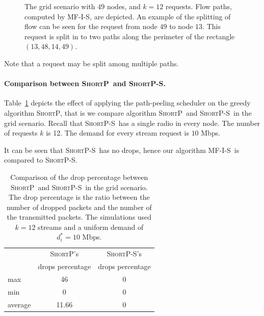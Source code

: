 \documentclass[12pt]{article}
\newenvironment{proof sketch}[1]{\noindent {\emph{Proof sketch of #1:}}}{\hfill \qed}
\newcommand{\algA}{\textsc{MF-I-S}}
\newcommand{\algB}{\textsc{ShortP}}
\newcommand{\algBS}{\textsc{ShortP-S}}
\begin{document}
\begin{figure}[H]
      \centering
        \caption{The grid scenario with $49$ nodes, and $k=12$
          requests.  Flow paths, computed by \algA, are depicted.  An
          example of the splitting of flow can be seen for the request
          from node $49$ to node $13$. This request is split in to
          two paths along the perimeter of the rectangle
          $(13,48,14,49)$.}
      \label{fig:big6}\label{fig:scenario grid}
     \end{figure}

Note that a request may be split among multiple paths.

\paragraph{Comparison between \algB\ and \algBS.}
Table~\ref{tab:dropsBS} depicts the effect of applying the path-peeling scheduler on the greedy algorithm \algB, that is we compare algorithm \algB\ and \algBS\ in the grid scenario.
Recall that \algBS\ has a single radio in every node.
The number of requests $k$ is 12. The demand for every stream request is $10$ Mbps.

It can be seen that \algBS\ has no drops, hence our algorithm \algA\ is compared to \algBS.
\begin{table}
\centering\small
\begin{tabular}{|| l || c | c ||}

\hline
 & \algB 's            & \algBS 's \\
    &  drops percentage   & drops percentage \\
\hline\hline
max     & 46 & 0  \\
min     & 0 & 0 \\
average & 11.66  & 0 \\
\hline
\end{tabular}
\caption{
  Comparison of the drop percentage between \algB\ and \algBS\ in the grid scenario. The drop percentage is
  the ratio between the number of
  dropped packets and the number of the transmitted packets. The simulations used $k=12$ streams and a uniform demand of $d_i^*=10$ Mbps.}
\label{tab:dropsBS}
\end{table}
\end{document}
